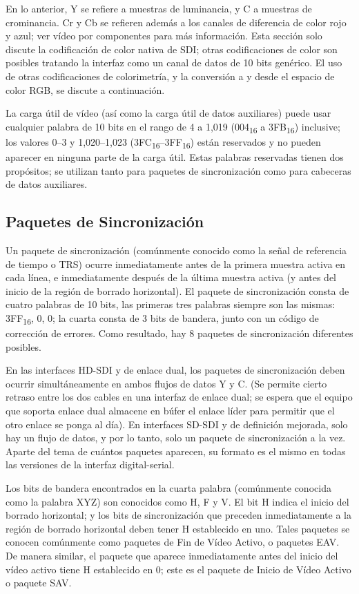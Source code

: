 En lo anterior, Y se refiere a muestras de luminancia, y C a muestras de crominancia. Cr y
Cb se refieren además a los canales de diferencia de color rojo y azul; ver vídeo por
componentes para más información. Esta sección solo discute la codificación de color nativa
de SDI\@; otras codificaciones de color son posibles tratando la interfaz como un canal de
datos de 10 bits genérico. El uso de otras codificaciones de colorimetría, y la conversión
a y desde el espacio de color RGB, se discute a continuación.

La carga útil de vídeo (así como la carga útil de datos auxiliares) puede usar cualquier
palabra de 10 bits en el rango de 4 a 1,019 (004\textsubscript{16} a 3FB\textsubscript{16})
inclusive; los valores 0–3 y 1,020–1,023 (3FC\textsubscript{16}–3FF\textsubscript{16}) están
reservados y no pueden aparecer en ninguna parte de la carga útil. Estas palabras reservadas
tienen dos propósitos; se utilizan tanto para paquetes de sincronización como para cabeceras
de datos auxiliares.

\subsection{Paquetes de Sincronización}

Un paquete de sincronización (comúnmente conocido como la señal de referencia de tiempo o TRS)
ocurre inmediatamente antes de la primera muestra activa en cada línea, e inmediatamente después
de la última muestra activa (y antes del inicio de la región de borrado horizontal). El paquete
de sincronización consta de cuatro palabras de 10 bits, las primeras tres palabras siempre son
las mismas: 3FF\textsubscript{16}, 0, 0; la cuarta consta de 3 bits de bandera, junto con un código de corrección
de errores. Como resultado, hay 8 paquetes de sincronización diferentes posibles.

En las interfaces HD-SDI y de enlace dual, los paquetes de sincronización deben ocurrir
simultáneamente en ambos flujos de datos Y y C. (Se permite cierto retraso entre los dos cables
en una interfaz de enlace dual; se espera que el equipo que soporta enlace dual almacene en
búfer el enlace líder para permitir que el otro enlace se ponga al día). En interfaces SD-SDI y
de definición mejorada, solo hay un flujo de datos, y por lo tanto, solo un paquete de
sincronización a la vez. Aparte del tema de cuántos paquetes aparecen, su formato es el mismo en
todas las versiones de la interfaz digital-serial.

Los bits de bandera encontrados en la cuarta palabra (comúnmente conocida como la palabra XYZ)
son conocidos como H, F y V. El bit H indica el inicio del borrado horizontal; y los bits de
sincronización que preceden inmediatamente a la región de borrado horizontal deben tener H
establecido en uno. Tales paquetes se conocen comúnmente como paquetes de Fin de Vídeo Activo, o
paquetes EAV\@. De manera similar, el paquete que aparece inmediatamente antes del inicio del vídeo
activo tiene H establecido en 0; este es el paquete de Inicio de Vídeo Activo o paquete SAV\@.

